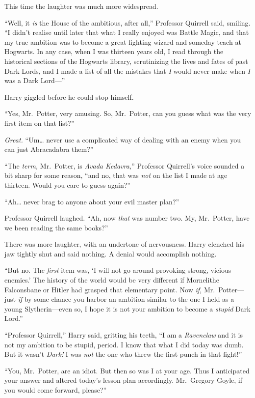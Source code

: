 This time the laughter was much more widespread.

``Well, it \emph{is} the House of the ambitious, after all,'' Professor
Quirrell said, smiling. ``I didn't realise until later that what I
really enjoyed was Battle Magic, and that my true ambition was to become
a great fighting wizard and someday teach at Hogwarts. In any case, when
I was thirteen years old, I read through the historical sections of the
Hogwarts library, scrutinizing the lives and fates of past Dark Lords,
and I made a list of all the mistakes that \emph{I} would never make
when \emph{I} was a Dark Lord---''

Harry giggled before he could stop himself.

``Yes, Mr.~Potter, very amusing. So, Mr.~Potter, can you guess what was
the very first item on that list?''

\emph{Great.} ``Um\ldots{} never use a complicated way of dealing with
an enemy when you can just Abracadabra them?''

``The \emph{term,} Mr.~Potter, is \emph{Avada Kedavra,}'' Professor
Quirrell's voice sounded a bit sharp for some reason, ``and no, that was
\emph{not} on the list I made at age thirteen. Would you care to guess
again?''

``Ah\ldots{} never brag to anyone about your evil master plan?''

Professor Quirrell laughed. ``Ah, now \emph{that} was number two. My,
Mr.~Potter, have we been reading the same books?''

There was more laughter, with an undertone of nervousness. Harry
clenched his jaw tightly shut and said nothing. A denial would
accomplish nothing.

``But no. The \emph{first} item was, `I will not go around provoking
strong, vicious enemies.' The history of the world would be very
different if Mornelithe Falconsbane or Hitler had grasped that
elementary point. Now \emph{if,} Mr.~Potter---just \emph{if} by some
chance you harbor an ambition similar to the one I held as a young
Slytherin---even so, I hope it is not your ambition to become a
\emph{stupid} Dark Lord.''

``Professor Quirrell,'' Harry said, gritting his teeth, ``I am a
\emph{Ravenclaw} and it is not my ambition to be stupid, period. I know
that what I did today was dumb. But it wasn't \emph{Dark!} I was
\emph{not} the one who threw the first punch in that fight!''

``You, Mr.~Potter, are an idiot. But then so was I at your age. Thus I
anticipated your answer and altered today's lesson plan accordingly.
Mr.~Gregory Goyle, if you would come forward, please?''


